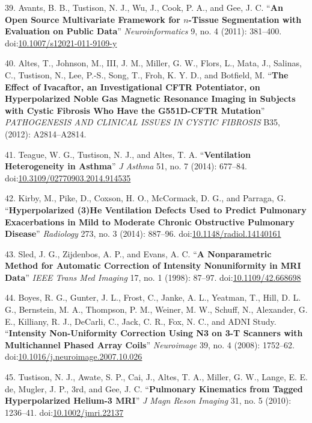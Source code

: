\documentclass[11pt,]{article}
\begin{document}
\hypertarget{ref-Avants:2011aa}{}
39. Avants, B. B., Tustison, N. J., Wu, J., Cook, P. A., and Gee, J. C.
``\textbf{An Open Source Multivariate Framework for \(n\)-Tissue
Segmentation with Evaluation on Public Data}'' \emph{Neuroinformatics}
9, no. 4 (2011): 381--400.
doi:\href{https://doi.org/10.1007/s12021-011-9109-y}{10.1007/s12021-011-9109-y}

\hypertarget{ref-Altes:2012aa}{}
40. Altes, T., Johnson, M., III, J. M., Miller, G. W., Flors, L., Mata,
J., Salinas, C., Tustison, N., Lee, P.-S., Song, T., Froh, K. Y. D., and
Botfield, M. ``\textbf{The Effect of Ivacaftor, an Investigational CFTR
Potentiator, on Hyperpolarized Noble Gas Magnetic Resonance Imaging in
Subjects with Cystic Fibrosis Who Have the G551D-CFTR Mutation}''
\emph{PATHOGENESIS AND CLINICAL ISSUES IN CYSTIC FIBROSIS} B35, (2012):
A2814--A2814.

\hypertarget{ref-Teague:2014aa}{}
41. Teague, W. G., Tustison, N. J., and Altes, T. A.
``\textbf{Ventilation Heterogeneity in Asthma}'' \emph{J Asthma} 51, no.
7 (2014): 677--84.
doi:\href{https://doi.org/10.3109/02770903.2014.914535}{10.3109/02770903.2014.914535}

\hypertarget{ref-Kirby:2014aa}{}
42. Kirby, M., Pike, D., Coxson, H. O., McCormack, D. G., and Parraga,
G. ``\textbf{Hyperpolarized (3)He Ventilation Defects Used to Predict
Pulmonary Exacerbations in Mild to Moderate Chronic Obstructive
Pulmonary Disease}'' \emph{Radiology} 273, no. 3 (2014): 887--96.
doi:\href{https://doi.org/10.1148/radiol.14140161}{10.1148/radiol.14140161}

\hypertarget{ref-Sled:1998aa}{}
43. Sled, J. G., Zijdenbos, A. P., and Evans, A. C. ``\textbf{A
Nonparametric Method for Automatic Correction of Intensity Nonuniformity
in MRI Data}'' \emph{IEEE Trans Med Imaging} 17, no. 1 (1998): 87--97.
doi:\href{https://doi.org/10.1109/42.668698}{10.1109/42.668698}

\hypertarget{ref-Boyes:2008aa}{}
44. Boyes, R. G., Gunter, J. L., Frost, C., Janke, A. L., Yeatman, T.,
Hill, D. L. G., Bernstein, M. A., Thompson, P. M., Weiner, M. W.,
Schuff, N., Alexander, G. E., Killiany, R. J., DeCarli, C., Jack, C. R.,
Fox, N. C., and ADNI Study. ``\textbf{Intensity Non-Uniformity
Correction Using N3 on 3-T Scanners with Multichannel Phased Array
Coils}'' \emph{Neuroimage} 39, no. 4 (2008): 1752--62.
doi:\href{https://doi.org/10.1016/j.neuroimage.2007.10.026}{10.1016/j.neuroimage.2007.10.026}

\hypertarget{ref-Tustison:2010aa}{}
45. Tustison, N. J., Awate, S. P., Cai, J., Altes, T. A., Miller, G. W.,
Lange, E. E. de, Mugler, J. P., 3rd, and Gee, J. C. ``\textbf{Pulmonary
Kinematics from Tagged Hyperpolarized Helium-3 MRI}'' \emph{J Magn Reson
Imaging} 31, no. 5 (2010): 1236--41.
doi:\href{https://doi.org/10.1002/jmri.22137}{10.1002/jmri.22137}
\end{document}
